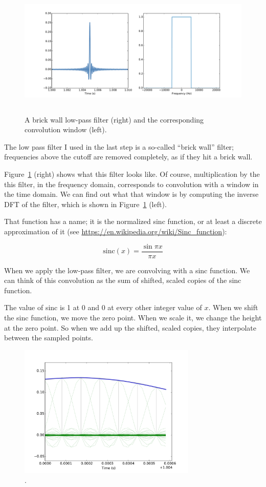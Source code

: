 \documentclass[12pt]{book}
\begin{document}
\begin{figure}
\centerline{\includegraphics[height=2.5in]{figs/sampling6.pdf}}
\caption{A brick wall low-pass filter (right) and the corresponding
convolution window (left).}
\label{fig.sampling6}
\end{figure}

The low pass filter I used in the last step is a so-called ``brick wall''
filter; frequencies above the cutoff are removed completely, as if they
hit a brick wall.

Figure~\ref{fig.sampling6} (right) shows what this filter looks like.
Of course, multiplication by the this filter, in the frequency domain,
corresponds to convolution with a window in the time domain.  We can
find out what that window is by computing the inverse DFT of the
filter, which is shown in Figure~\ref{fig.sampling6} (left).

That function has a name; it is the normalized sinc function, or at
least a discrete approximation of it (see
\url{https://en.wikipedia.org/wiki/Sinc_function}):

\[ \mathrm{sinc}(x) = \frac{\sin \pi x}{\pi x} \]

When we apply the low-pass filter, we are convolving with a sinc
function.  We can think of this convolution as the sum of shifted,
scaled copies of the sinc function.  

The value of sinc is 1 at 0 and 0 at every other integer
value of $x$.  When we shift the sinc function, we move the zero point.
When we scale it, we change the height at the zero point.
So when we add up the shifted, scaled copies, they interpolate
between the sampled points.

\begin{figure}
\centerline{\includegraphics[height=2.5in]{figs/sampling8.pdf}}
\caption{.}
\label{fig.sampling8}
\end{figure}
\end{document}
